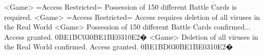 <Game> =Access Restricted= Possession of 150 different Battle Cards is required. 
<Game> =Access Restricted= Access requires deletion of all viruses in the Real World 
<Game> Possession of 150 different Battle Cards confirmed... Access granted. 
{0B}{E1}{BC}{03}{0B}{E1}{BE}{03}{10}{E2}�
<Game> Deletion of all viruses in the Real World confirmed. Access granted. 
{0B}{E1}{BD}{03}{0B}{E1}{BE}{03}{10}{E2}�
